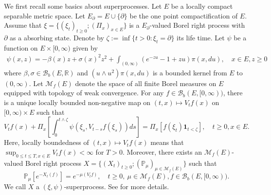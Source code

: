 \documentclass[12pt,a4paper]{amsart}
\numberwithin{equation}{section}
\theoremstyle{plain}
\theoremstyle{definition}
\theoremstyle{remark}
\begin{document}
	We first recall some basics about superprocesses.
	Let $E$ be a locally compact separable metric space.
	Let $E_\partial = E \cup \{\partial\}$ be the one point compactification of $E$.
	Assume that $\xi = \{(\xi_t)_{t\ge0}; (\Pi_x)_{x\in E}\}$ is a $E_\partial$-valued Borel right process with $\partial$ as a absorbing state.
	Denote by $\zeta:=\inf\{t>0: \xi_t=\partial\}$ its life time.
	Let $\psi$ be a function on $E \times [0,\infty)$ given by
\begin{align}
	\psi(x,z)
	= -\beta(x) z + \sigma(x)^2 z^2 + \int_{(0,\infty)} (e^{-zu} -1 + zu) \pi(x,du),
	\quad x\in E, z\geq 0
\end{align}
	where $\beta, \sigma \in \mathcal B_b(E,\mathbb R)$ and $(u \wedge u^2) \pi(x,du)$ is a bounded kernel from $E$ to $(0,\infty)$.
	Let $\mathcal M_f(E)$ denote the space of all finite Borel measures on $E$ equipped with topology of weak convergence.
	For any $f \in \mathcal B_b(E, [0,\infty))$, there is a unique locally bounded non-negative map on $(t,x)\mapsto V_tf(x)$ on $[0,\infty) \times E$ such that
\begin{equation} \label{eq:BGD.1}
	V_tf(x) + \Pi_x \left[ \int_0^{t\wedge \zeta} \psi \left(\xi_s, V_{t-s}f(\xi_s)\right) ds\right]
	= \Pi_x\left[ f(\xi_t) \mathbf 1_{t < \zeta}\right], \quad t\geq 0, x\in E.
\end{equation}
	Here, locally boundedness of $(t,x) \mapsto V_tf(x)$ means that $\sup_{0\leq t\leq T, x\in E} V_tf(x)< \infty$ for $T >0$.
	Moreover, there exists an $\mathcal M_f(E)$-valued Borel right process $X =\{(X_t)_{t\geq 0}; (\mathbb P_\mu)_{\mu \in \mathcal M_f(E)}\}$ such that
\begin{equation}
	\mathbb P_\mu[e^{- X_t(f)}]
	= e^{- \mu(V_tf)},
	\quad t\geq 0,~\mu \in \mathcal M_f(E), f \in \mathcal B_b(E,[0,\infty)).
\end{equation}
	We call $X$ a $(\xi, \psi)$-superprocess.
	See \cite{Li2011MeasureValued} for more details.
\end{document}

